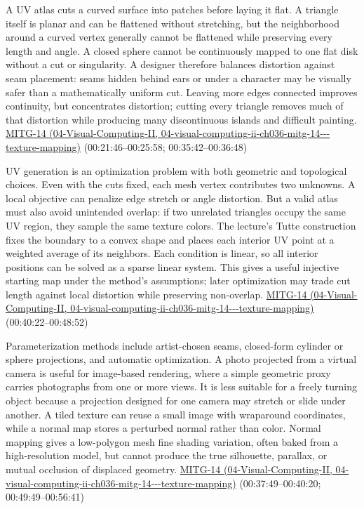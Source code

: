 A UV atlas cuts a curved surface into patches before laying it flat. A triangle itself is planar and can be flattened without stretching, but the neighborhood around a curved vertex generally cannot be flattened while preserving every length and angle. A closed sphere cannot be continuously mapped to one flat disk without a cut or singularity. A designer therefore balances distortion against seam placement: seams hidden behind ears or under a character may be visually safer than a mathematically uniform cut. Leaving more edges connected improves continuity, but concentrates distortion; cutting every triangle removes much of that distortion while producing many discontinuous islands and difficult painting. \href{../04-Visual-Computing-II/main.pdf\#nameddest=04-visual-computing-ii-ch036-mitg-14---texture-mapping}{MITG-14 (04-Visual-Computing-II, 04-visual-computing-ii-ch036-mitg-14-\/-\/-texture-mapping)} (00:21:46--00:25:58; 00:35:42--00:36:48)

UV generation is an optimization problem with both geometric and topological choices. Even with the cuts fixed, each mesh vertex contributes two unknowns. A local objective can penalize edge stretch or angle distortion. But a valid atlas must also avoid unintended overlap: if two unrelated triangles occupy the same UV region, they sample the same texture colors. The lecture's Tutte construction fixes the boundary to a convex shape and places each interior UV point at a weighted average of its neighbors. Each condition is linear, so all interior positions can be solved as a sparse linear system. This gives a useful injective starting map under the method's assumptions; later optimization may trade cut length against local distortion while preserving non-overlap. \href{../04-Visual-Computing-II/main.pdf\#nameddest=04-visual-computing-ii-ch036-mitg-14---texture-mapping}{MITG-14 (04-Visual-Computing-II, 04-visual-computing-ii-ch036-mitg-14-\/-\/-texture-mapping)} (00:40:22--00:48:52)

Parameterization methods include artist-chosen seams, closed-form cylinder or sphere projections, and automatic optimization. A photo projected from a virtual camera is useful for image-based rendering, where a simple geometric proxy carries photographs from one or more views. It is less suitable for a freely turning object because a projection designed for one camera may stretch or slide under another. A tiled texture can reuse a small image with wraparound coordinates, while a normal map stores a perturbed normal rather than color. Normal mapping gives a low-polygon mesh fine shading variation, often baked from a high-resolution model, but cannot produce the true silhouette, parallax, or mutual occlusion of displaced geometry. \href{../04-Visual-Computing-II/main.pdf\#nameddest=04-visual-computing-ii-ch036-mitg-14---texture-mapping}{MITG-14 (04-Visual-Computing-II, 04-visual-computing-ii-ch036-mitg-14-\/-\/-texture-mapping)} (00:37:49--00:40:20; 00:49:49--00:56:41)

